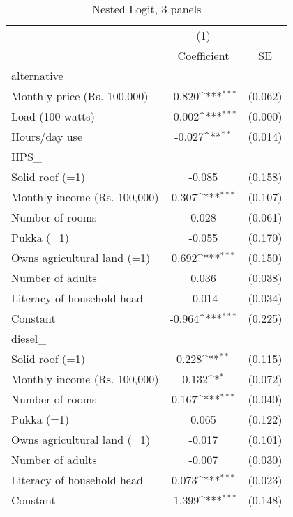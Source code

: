 \begin{table}[htbp]\centering
\def\sym#1{\ifmmode^{#1}\else\(^{#1}\)\fi}
\caption{Nested Logit, 3 panels}
\begin{tabular}{l*{1}{cc}}
\toprule
                    &\multicolumn{1}{c}{(1)}         &            \\
                    & Coefficient         &          SE\\
\midrule
alternative         &                     &            \\
Monthly price (Rs. 100,000)&      -0.820\sym{***}&     (0.062)\\
Load (100 watts)    &      -0.002\sym{***}&     (0.000)\\
Hours/day use       &      -0.027\sym{**} &     (0.014)\\
\midrule
HPS\_                &                     &            \\
Solid roof (=1)     &      -0.085         &     (0.158)\\
Monthly income (Rs. 100,000)&       0.307\sym{***}&     (0.107)\\
Number of rooms     &       0.028         &     (0.061)\\
Pukka (=1)          &      -0.055         &     (0.170)\\
Owns agricultural land (=1)&       0.692\sym{***}&     (0.150)\\
Number of adults    &       0.036         &     (0.038)\\
Literacy of household head&      -0.014         &     (0.034)\\
Constant            &      -0.964\sym{***}&     (0.225)\\
\midrule
diesel\_             &                     &            \\
Solid roof (=1)     &       0.228\sym{**} &     (0.115)\\
Monthly income (Rs. 100,000)&       0.132\sym{*}  &     (0.072)\\
Number of rooms     &       0.167\sym{***}&     (0.040)\\
Pukka (=1)          &       0.065         &     (0.122)\\
Owns agricultural land (=1)&      -0.017         &     (0.101)\\
Number of adults    &      -0.007         &     (0.030)\\
Literacy of household head&       0.073\sym{***}&     (0.023)\\
Constant            &      -1.399\sym{***}&     (0.148)\\

\end{tabular}
\end{table}
